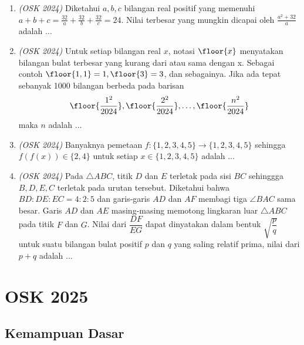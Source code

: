 \documentclass[11pt]{scrartcl}
\begin{document}
\begin{enumerate}
    \item \textit{(OSK 2024)} Diketahui $a,b,c$ bilangan real positif yang memenuhi $a+b+c = \frac{32}{a}+\frac{32}{b}+\frac{32}{c} = 24$. Nilai terbesar yang mungkin dicapai oleh $\frac{a^2+32}{a}$ adalah $\dots$

    \item \textit{(OSK 2024)} Untuk setiap bilangan real $x$, notasi $\floor{x}$ menyatakan bilangan bulat terbesar yang kurang dari atau sama dengan x. Sebagai contoh $\floor{1,1} = 1,\floor{3} = 3$, dan sebagainya. Jika ada tepat sebanyak 1000 bilangan berbeda pada barisan
    \[
    \floor{\frac{1^2}{2024}},\floor{\frac{2^2}{2024}}, \dots, \floor{\frac{n^2}{2024}}
    \]
    maka $n$ adalah $\dots$
    

    \item \textit{(OSK 2024)} Banyaknya pemetaan $f:\{1,2,3,4,5\}\to\{1,2,3,4,5\}$ sehingga $f(f(x))\in\{2,4\}$ untuk setiap $x\in \{1,2,3,4,5\}$ adalah $\dots$

    \item \textit{(OSK 2024)} Pada $\triangle ABC$, titik $D$ dan $E$ terletak pada sisi $BC$ sehinggga $B, D, E, C$ terletak pada urutan tersebut. Diketahui bahwa $BD : DE : EC = 4 : 2 : 5$ dan garis-garis $AD$ dan $AF$ membagi tiga $\angle BAC$ sama besar. Garis $AD$ dan $AE$ masing-masing memotong lingkaran luar $\triangle ABC$ pada titik $F$ dan $G$. Nilai dari $\dfrac{DF}{EG}$ dapat dinyatakan dalam bentuk $\sqrt{\dfrac{p}{q}}$ untuk suatu bilangan bulat positif $p$ dan $q$ yang saling relatif prima, nilai dari $p + q$ adalah $\dots$
\end{enumerate}
\newpage
\section{OSK 2025}
\subsection{Kemampuan Dasar}
\end{document}

